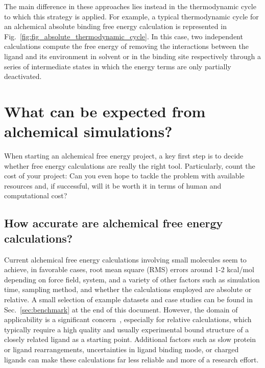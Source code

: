 \documentclass[9pt,bestpractices]{livecoms}
\begin{document}
The main difference in these approaches lies instead in the thermodynamic cycle to which this strategy is applied.
For example, a typical thermodynamic cycle for an alchemical absolute binding free energy calculation is represented in Fig.~\ref{fig:fig_absolute_thermodynamic_cycle}.
In this case, two independent calculations compute the free energy of removing the interactions between the ligand and its environment in solvent or in the binding site respectively through a series of intermediate states in which the energy terms are only partially deactivated.




\section{What can be expected from alchemical simulations?}
\label{sec:step0}
When starting an alchemical free energy project, a key first step is to decide whether free energy calculations are really the right tool. Particularly, count the cost of your
project: Can you even hope to tackle the problem with available resources and, if successful, will it
be worth it in terms of human and computational cost?

\subsection{How accurate are alchemical free energy calculations?}
\label{subsec:expectation}
Current alchemical free energy calculations involving small molecules seem to achieve, in favorable cases, root mean square (RMS) errors around 1-2 kcal/mol depending on force field, system, and a variety of other factors such as simulation time, sampling method, and whether the calculations employed are absolute or relative. A small selection of example datasets and case studies can be found in Sec.~\ref{sec:benchmark} at the end of this document.
However, the domain of applicability is a significant concern~\cite{sherborne2016collaborating, cournia2017relative}, especially for relative calculations, which typically require a high quality and usually experimental bound structure of a closely
related ligand as a starting point. Additional factors such as slow protein or ligand rearrangements, uncertainties in ligand binding mode, or charged ligands can make these calculations far less reliable and more of a research effort.
\end{document}
